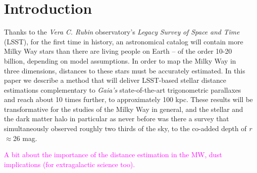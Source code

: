 \documentclass[linenumbers, twocolumn, trackchanges]{aastex631}
\newcommand{\magcom}[1]{\textcolor{magenta}{#1}} %
\begin{document}

\section{Introduction} \label{sec:intro}

Thanks to the \textit{Vera C. Rubin} observatory's \textit{Legacy Survey of Space and Time} (LSST), for the first time in history, an astronomical catalog will contain more Milky Way stars than there are living people on Earth -- of the order 10-20 billion, depending on model assumptions. In order to map the Milky Way in three dimensions, distances to these stars must be accurately  estimated. In this paper we describe a method that will deliver LSST-based stellar distance estimations complementary to \textit{Gaia's} state-of-the-art trigonometric parallaxes and reach about 10 times further, to approximately 100 kpc. These results will be transformative for the studies of the Milky Way in general, and the stellar and the dark matter halo in particular as never before was there a survey that simultaneously observed roughly two thirds of the sky, to the co-added depth of \textit{r}$\approx$26 mag. 

\magcom{A bit about the importance of the distance estimation in the MW, dust implications (for extragalactic science too).}
\end{document}
